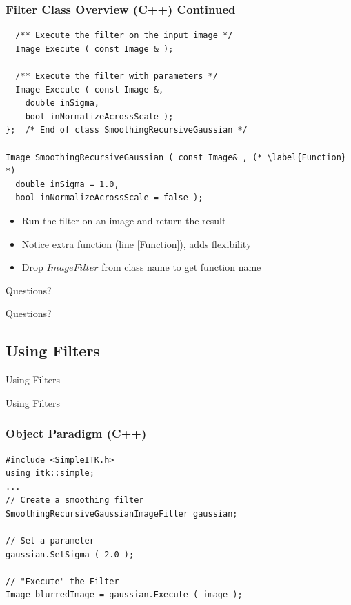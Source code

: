 \begin{frame}[fragile]
\frametitle{Filter Class Overview (C++) Continued}
\lstcpp
\begin{lstlisting}
  /** Execute the filter on the input image */
  Image Execute ( const Image & );

  /** Execute the filter with parameters */
  Image Execute ( const Image &,
    double inSigma,
    bool inNormalizeAcrossScale );
};  /* End of class SmoothingRecursiveGaussian */

Image SmoothingRecursiveGaussian ( const Image& , (* \label{Function} *)
  double inSigma = 1.0,
  bool inNormalizeAcrossScale = false );

\end{lstlisting}
\begin{itemize}
  \item Run the filter on an image and return the result
  \item Notice extra function (line \ref{Function}), adds flexibility
  \item Drop $ImageFilter$ from class name to get function name
\end{itemize}

\end{frame}

\begin{frame}{Questions?}
\fontsize{36pt}{36pt}\selectfont
\center
\begin{center}
Questions?
\end{center}
\end{frame}

\subsection{Using Filters}
\begin{frame}{Using Filters}
\fontsize{36pt}{36pt}\selectfont
\center
\begin{center}
Using Filters
\end{center}
\end{frame}

\begin{frame}[fragile]
\frametitle{Object Paradigm (C++)}
\lstcpp
\begin{lstlisting}
#include <SimpleITK.h>
using itk::simple;
...
// Create a smoothing filter
SmoothingRecursiveGaussianImageFilter gaussian;

// Set a parameter
gaussian.SetSigma ( 2.0 );

// "Execute" the Filter
Image blurredImage = gaussian.Execute ( image );
\end{lstlisting}
\end{frame}

